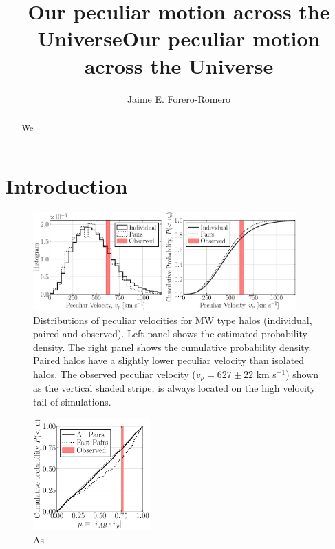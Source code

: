 \documentclass[onecolumn]{aastex62}
\title{Our peculiar motion across the Universe}
\begin{document}
\title{Our peculiar motion across the Universe}

\author{Jaime E. Forero-Romero}


\begin{abstract}
We
\end{abstract}

\section{Introduction}


\cite{2009PhRvD..80d3005E}





\begin{figure}
\begin{center}
  \includegraphics[width=0.9\textwidth]{cumulative_probability_18.pdf}
\end{center}
\caption{Distributions of peculiar velocities for MW type halos
  (individual, paired and observed). 
  Left panel shows the estimated probability density.
  The right panel shows the cumulative probability density.
  Paired halos have a slightly lower peculiar velocity than isolated
  halos.
  The observed peculiar velocity ($v_p=627\pm22$ km s$^{-1}$) shown as
  the vertical shaded stripe, is always located on the high velocity
  tail of simulations.}
\label{fig:proba}
\end{figure} 

\begin{figure}
\begin{center}
  \includegraphics[width=0.4\textwidth]{cumulative_alignment_06.pdf}
\end{center}
\caption{As}
\label{fig:alignment}
\end{figure}
\end{document}
